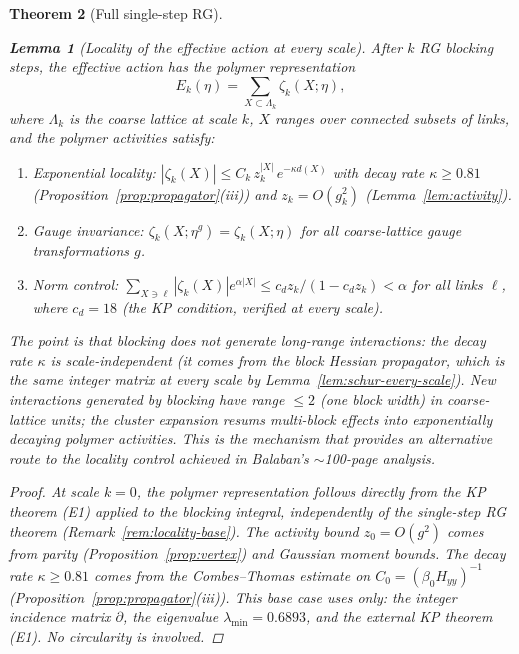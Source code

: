 \documentclass[11pt]{article}
\newtheorem{theorem}{Theorem}[section]
\newtheorem{lemma}[theorem]{Lemma}
\theoremstyle{definition}
\begin{document}
\begin{theorem}[Full single-step RG]
\begin{lemma}[Locality of the effective action at every scale]%
\label{lem:rg-locality}
After $k$ RG blocking steps, the effective action has the
polymer representation
\begin{equation}
E_k(\eta)=\sum_{X\subset\Lambda_k}\zeta_k(X;\eta),
\end{equation}
where $\Lambda_k$ is the coarse lattice at scale $k$,
$X$ ranges over connected subsets of links, and the
polymer activities satisfy:
\begin{enumerate}[nosep,label=(\roman*)]
\item \emph{Exponential locality:}
$|\zeta_k(X)|\le C_k\,z_k^{|X|}\,e^{-\kappa d(X)}$
with decay rate $\kappa\ge 0.81$
(Proposition~\ref{prop:propagator}(iii))
and $z_k=O(g_k^2)$ (Lemma~\ref{lem:activity}).
\item \emph{Gauge invariance:}
$\zeta_k(X;\eta^g)=\zeta_k(X;\eta)$ for all coarse-lattice
gauge transformations $g$.
\item \emph{Norm control:}
$\sum_{X\ni\ell}|\zeta_k(X)|e^{\alpha|X|}
\le c_d z_k/(1-c_d z_k)<\alpha$ for all links $\ell$,
where $c_d=18$ (the KP condition, verified at every scale).
\end{enumerate}
The point is that blocking does not generate
long-range interactions: the decay rate $\kappa$ is
scale-independent (it comes from the block Hessian
propagator, which is the same integer matrix at every scale
by Lemma~\ref{lem:schur-every-scale}).
New interactions generated by blocking have range $\le 2$
(one block width) in coarse-lattice units;
the cluster expansion resums multi-block effects into
exponentially decaying polymer activities.
This is the mechanism that provides an alternative route to
the locality control achieved in Balaban's
$\sim$100-page analysis.
\end{lemma}

\begin{proof}
At scale $k=0$, the polymer representation follows
directly from the KP theorem (E1) applied to the blocking
integral, independently of the single-step RG theorem
(Remark~\ref{rem:locality-base}).  The activity bound
$z_0=O(g^2)$ comes from parity
(Proposition~\ref{prop:vertex}) and Gaussian moment bounds.
The decay rate $\kappa\ge 0.81$ comes from the
Combes--Thomas estimate on $C_0=(\beta_0 H_{yy})^{-1}$
(Proposition~\ref{prop:propagator}(iii)).
This base case uses only:
the integer incidence matrix $\partial$,
the eigenvalue $\lambda_{\min}=0.6893$,
and the external KP theorem (E1).
No circularity is involved.


\end{proof}
\end{theorem}
\end{document}
